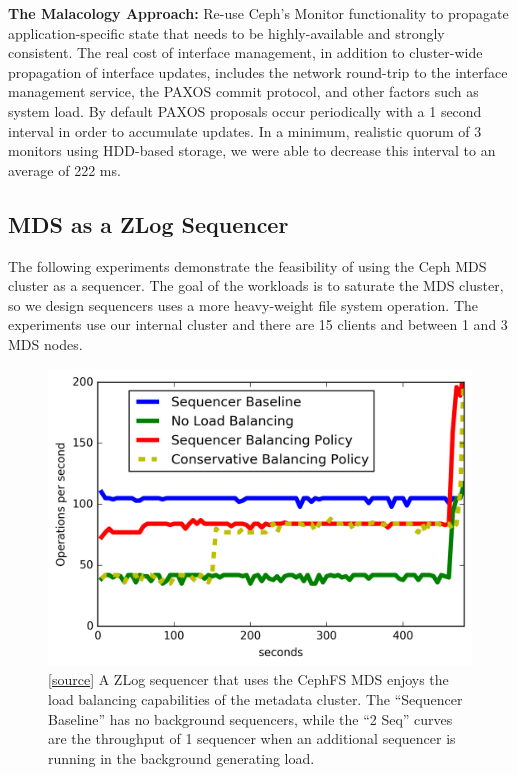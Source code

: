 \documentclass[preprint]{sigplanconf-eurosys}
\begin{document}
\textbf{The Malacology Approach:} Re-use Ceph's Monitor functionality to
propagate application-specific state that needs to be highly-available and
strongly consistent.  The real cost of interface management, in addition to
cluster-wide propagation of interface updates, includes the network round-trip
to the interface management service, the PAXOS commit protocol, and other
factors such as system load. By default PAXOS proposals occur periodically with
a 1 second interval in order to accumulate updates. In a minimum, realistic
quorum of 3 monitors using HDD-based storage, we were able to decrease this
interval to an average of 222 ms.

\subsection{MDS as a ZLog Sequencer}

The following experiments demonstrate the feasibility of using the Ceph MDS
cluster as a sequencer. The goal of the workloads is to saturate the MDS
cluster, so we design sequencers uses a more heavy-weight file system
operation. The experiments use our internal cluster and there are 15 clients
and between 1 and 3 MDS nodes. 

\begin{figure}[t!]
\centering
\includegraphics{figures/mantle-seq-thruput.png}
\caption{[\href{https://github.com/double-blind-submitter/osdi16}{source}] A
ZLog sequencer that uses the CephFS MDS enjoys the load balancing capabilities
of the metadata cluster. The ``Sequencer Baseline'' has no background
sequencers, while the ``2 Seq'' curves are the throughput of 1 sequencer when
an additional sequencer is running in the background generating
load.}\label{fig:mantle-seq-thruput}
\end{figure}
\end{document}
